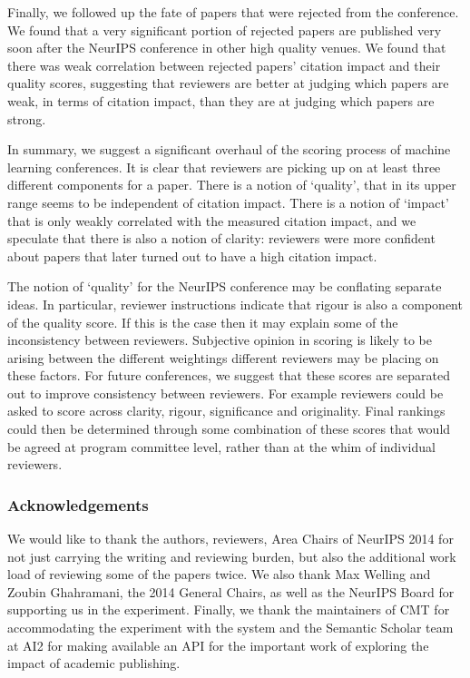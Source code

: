 \documentclass[twoside]{article}
\begin{document}
Finally, we followed up the fate of papers that were rejected from the
conference. We found that a very significant portion of rejected
papers are published very soon after the NeurIPS conference in other
high quality venues. We found that there was weak correlation between rejected papers' citation impact and their quality scores, suggesting that
reviewers are better at judging which papers are weak, in terms of
citation impact, than they are at judging which papers are strong.

In summary, we suggest a significant overhaul of the scoring process
of machine learning conferences. It is clear that reviewers are
picking up on at least three different components for a paper. There
is a notion of `quality', that in its upper range seems to be
independent of citation impact. There is a notion of `impact' that is
only weakly correlated with the measured citation impact, and we
speculate that there is also a notion of clarity: reviewers were more
confident about papers that later turned out to have a high citation
impact.

The notion of `quality' for the NeurIPS conference may be conflating
separate ideas. In particular, reviewer instructions indicate that
rigour is also a component of the quality score. If this is the case
then it may explain some of the inconsistency between
reviewers. Subjective opinion in scoring is likely to be arising
between the different weightings different reviewers may be placing on
these factors. For future conferences, we suggest that these scores
are separated out to improve consistency between reviewers. For
example reviewers could be asked to score across clarity, rigour,
significance and originality. Final rankings could then be determined
through some combination of these scores that would be agreed at
program committee level, rather than at the whim of individual
reviewers.

\subsubsection*{Acknowledgements}

We would like to thank the authors, reviewers, Area Chairs of NeurIPS 2014 for not just carrying the writing and reviewing burden, but also the additional work load of reviewing some of the papers twice. We also thank Max Welling and Zoubin Ghahramani, the 2014 General Chairs, as well as the NeurIPS Board for supporting us in the experiment. Finally, we thank the maintainers of CMT for accommodating the experiment with the system and the Semantic Scholar team at AI2 for making available an API for the important work of exploring the impact of academic publishing.



\appendix

\end{document}
